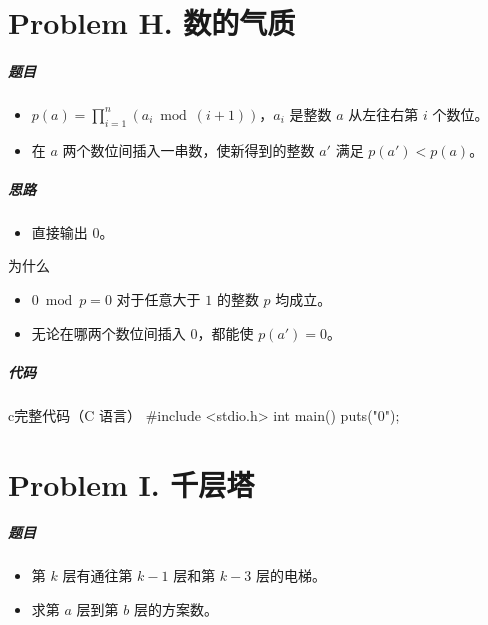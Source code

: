 \documentclass[
     aspectratio=169,                   %
]{beamer}
\begin{document}

\part{Problem H. 数的气质}
\begin{frame}
	\frametitle{题目}
	\begin{itemize}
		\item $p(a)=\prod_{i=1}^n(a_i \bmod (i+1))$，$a_i$ 是整数 $a$ 从左往右第 $i$ 个数位。
		\item 在 $a$ 两个数位间插入一串数，使新得到的整数 $a'$ 满足 $p(a')<p(a)$。
	\end{itemize}
\end{frame}

\begin{frame}
	\frametitle{思路}
	\begin{itemize}
		\item 直接输出 $0$。
	\end{itemize}
	
	\begin{block}{为什么}
		\begin{itemize}
			\item $0 \bmod p =0 $ 对于任意大于 $1$ 的整数 $p$ 均成立。
			\item 无论在哪两个数位间插入 $0$，都能使 $p(a')=0$。
		\end{itemize}
	\end{block}
\end{frame}

\begin{frame}[fragile]
	\frametitle{代码}
	 \begin{codeblock}{c}{完整代码（C 语言）}
#include <stdio.h>
int main() {
    puts("0");
}
\end{codeblock}
\end{frame}


\part{Problem I. 千层塔}
\begin{frame}
	\frametitle{题目}
	\begin{itemize}
		\item 第 $k$ 层有通往第 $k-1$ 层和第 $k-3$ 层的电梯。
		\item 求第 $a$ 层到第 $b$ 层的方案数。
	\end{itemize}
\end{frame}
\end{document}
